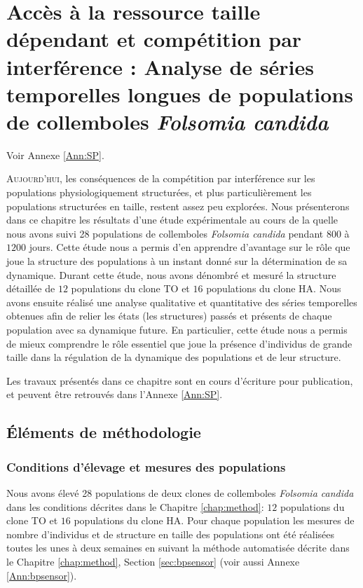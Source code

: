 \chapter{Accès à la ressource taille dépendant et compétition par interférence :
Analyse de séries temporelles longues de populations de collemboles \textit{Folsomia candida}}
\label{chap:sp}

\vspace{3cm}
Voir Annexe \ref{Ann:SP}.
\vspace{1.5cm}

\lettrine[lines=3]{A}{ujourd'hui}, les conséquences de la compétition par
interférence sur les populations physiologiquement structurées, et plus
particulièrement les populations structurées en taille, restent assez peu
explorées. Nous présenterons dans ce chapitre les résultats d'une étude
expérimentale au cours de la quelle nous avons suivi 28 populations de
collemboles \textit{Folsomia candida} pendant $800$ à $1200$ jours. Cette étude
nous a permis d'en apprendre d'avantage sur le rôle que joue la structure des
populations à un instant donné sur la détermination de sa dynamique. Durant
cette étude, nous avons dénombré et mesuré la structure détaillée de $12$
populations du clone TO et $16$ populations du clone HA. Nous avons ensuite
réalisé une analyse qualitative et quantitative des séries temporelles obtenues
afin de relier les états (les structures) passés et présents de chaque
population avec sa dynamique future.
En particulier, cette étude nous a permis de mieux comprendre le rôle essentiel
que joue la présence d'individus de grande taille dans la régulation de la
dynamique des populations et de leur structure.

Les travaux présentés dans ce chapitre sont en cours d'écriture pour
publication, et peuvent être retrouvés dans l'Annexe \ref{Ann:SP}.

\section{Éléments de méthodologie}

\subsection{Conditions d'élevage et mesures des populations}

Nous avons élevé 28 populations de deux clones de
collemboles \textit{Folsomia candida} dans les conditions décrites dans le
Chapitre \ref{chap:method}: $12$ populations du clone
TO et $16$ populations du clone HA. Pour chaque population les mesures de nombre
d'individus et de structure en taille des populations ont été réalisées toutes
les unes à deux semaines en suivant la méthode automatisée décrite dans le
Chapitre \ref{chap:method}, Section \ref{sec:bpsensor} (voir aussi Annexe
\ref{Ann:bpsensor}).

